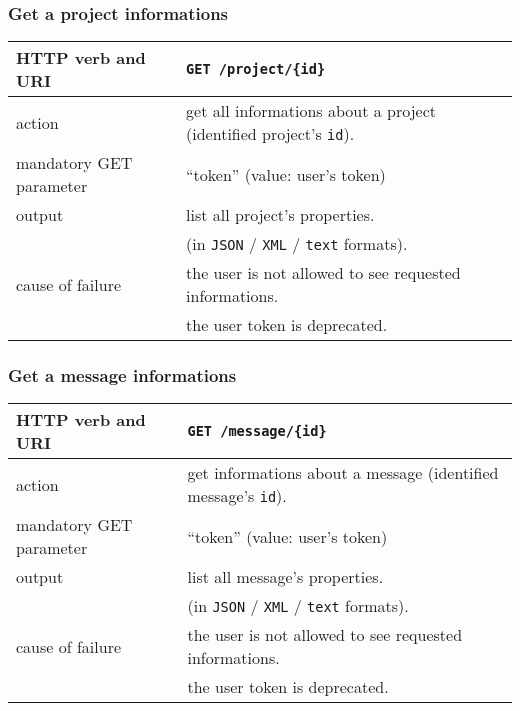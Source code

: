 \subsubsection{Get a project informations}
\begin{tabular}{ | l | l | }
	\hline
	HTTP verb and URI & \texttt{GET /project/\{id\}} \\
	\hline
	action & get all informations about a project (identified \via project’s \texttt{id}). \\
	\hline
	mandatory GET parameter & ``token'' (value: user's token) \\
	\hline
	output & list all project's properties.  \\
	\space & (in \texttt{JSON} / \texttt{XML} / \texttt{text} formats). \\
	\hline
	cause of failure & the user is not allowed to see requested informations. \\
	\space & the user token is deprecated. \\
	\hline
\end{tabular}
\newline

\subsubsection{Get a message informations}
\begin{tabular}{ | l | l | }
	\hline
	HTTP verb and URI & \texttt{GET /message/\{id\}} \\
	\hline
	action & get informations about a message (identified \via message’s \texttt{id}). \\
	\hline
	mandatory GET parameter & ``token'' (value: user's token) \\
	\hline
	output & list all message's properties.  \\
	\space & (in \texttt{JSON} / \texttt{XML} / \texttt{text} formats). \\
	\hline
	cause of failure & the user is not allowed to see requested informations. \\
	\space & the user token is deprecated. \\
	\hline
\end{tabular}
\newline

